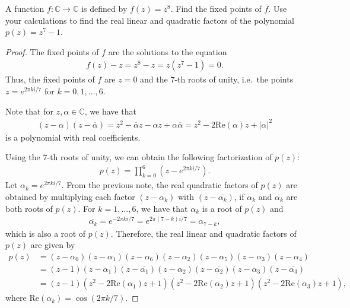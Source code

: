 \begin{problem}{1}
  A function $f:\mathbb{C} \to \mathbb{C}$ is defined by $f(z) = z^8$. Find the fixed points of $f$.
  Use your calculations to find the real linear and quadratic factors of the polynomial $p(z) = z^7 - 1$.
\end{problem}

\begin{proof}
  The fixed points of $f$ are the solutions to the equation
  \begin{align*}
    f(z) - z = z^8 - z = z(z^7 - 1) = 0.
  \end{align*}
  Thus, the fixed points of $f$ are $z=0$ and the $7$-th roots of unity, i.e.\
  the points $z = e^{2\pi k i/ 7}$ for $k = 0, 1, \dots, 6$.

  Note that for $z, \alpha \in \mathbb{C}$, we have that
  \begin{align*}
    (z- \alpha)(z-\overline{\alpha}) = z^2 - \overline{\alpha}z - \alpha z + \alpha \overline{\alpha} = z^2 - 2 \text{Re}(\alpha)z + |\alpha|^2
  \end{align*}
  is a polynomial with real coefficients.

  Using the $7$-th roots of unity, we can obtain the following factorization of $p(z)$:
  \begin{align*}
    p(z) = \prod_{k=0}^6 \left(z - e^{2\pi k i / 7}\right).
  \end{align*}
  Let $\alpha_k = e^{2\pi k i  / 7}$. From the previous note, the real quadratic factors of $p(z)$ are obtained by multiplying
  each factor $(z - \alpha_k)$ with $(z - \overline{\alpha_k})$, if $\alpha_k$ and $\overline{\alpha_k}$ are both roots of $p(z)$. For $k = 1, \dots, 6$,
  we have that $\alpha_k$ is a root of $p(z)$ and
  \begin{align*}
    \overline{\alpha_k} = e^{-2\pi k i / 7} = e ^{2\pi(7-k)i/7} = \alpha_{7-k},
  \end{align*}
  which is also a root of $p(z)$.
  Therefore,
  the real linear and quadratic factors of $p(z)$ are given by
  \begin{align*}
    p(z) &= (z-\alpha_0) \left(z - \alpha_1\right)\left(z - \alpha_6\right) \left(z - \alpha_2\right)\left(z - \alpha_5\right) \left(z - \alpha_3\right)\left(z - \alpha_4\right) \\
    &= (z-1) \left(z - \alpha_1\right)\left(z - \overline{\alpha_1}\right) \left(z - \alpha_2\right)\left(z - \overline{\alpha_2}\right) \left(z - \alpha_3\right)\left(z - \overline{\alpha_3}\right) \\
    &= (z-1)\left(z^2 - 2\text{Re}(\alpha_1)z + 1\right) \left(z^2 - 2\text{Re}(\alpha_2) z  + 1\right) \left(z^2 - 2\text{Re}(\alpha_3)z + 1\right),
  \end{align*}
  where $\text{Re}(\alpha_k) = \cos(2\pi k / 7)$.

\end{proof}
\newpage
